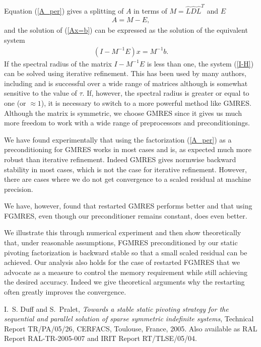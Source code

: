 \documentclass{siamltex}
\begin{document}
Equation (\ref{A_per}) gives a splitting of $A$ in terms of $M = \hat{L} \hat{D} \hat{L}^T$ and $E$
\begin{eqnarray}\label{A_split}
A = M - E,
\end{eqnarray}
and the solution of (\ref{Ax=b}) can be expressed as the solution of the equivalent system
\begin{eqnarray}\label{I-H}
(I - M^{-1} E) x = M^{-1}b.
\end{eqnarray}
If the spectral radius of the matrix $I - M^{-1} E $ is less than one, the system (\ref{I-H}) can be solved using
iterative refinement. This has been used by many authors, including \cite{dupr:05} and is successful over a wide range of matrices although is somewhat
sensitive to the value of $\tau$.  If, however, the
spectral radius is
greater or equal to one (or $\approx 1$), it is necessary to switch to a
more powerful
method like  GMRES. Although the matrix is symmetric, we choose
GMRES since it gives us much more freedom to work with a wide range of
preprocessors and preconditionings.

We have found experimentally that using the factorization (\ref{A_per}) as
a preconditioning for GMRES works in most cases and is, as expected much
more robust than iterative refinement.  Indeed GMRES gives
normwise backward stability in most cases, which is
not the case
for iterative refinement. However, there are cases where we
do not get convergence to a scaled residual at machine precision.

We have, however, found that restarted GMRES performs better and that using
FGMRES,
even though our preconditioner remains constant, does even
better.

We illustrate this through numerical experiment and then show theoretically
that, under reasonable assumptions, FGMRES preconditioned by our static
pivoting
factorization is backward stable so that a small scaled residual can
be achieved.  Our analysis also holds for the case of restarted FGMRES that we advocate as a measure to control the memory requirement while still
achieving the desired accuracy.  Indeed we give theoretical arguments why
the restarting often greatly improves the convergence.


\begin{thebibliography}{10}

{\sc I.~S. Duff and S.~Pralet}, {\em Towards a stable static pivoting strategy
  for the sequential and parallel solution of sparse symmetric indefinite
  systems}, {T}echnical {R}eport TR/PA/05/26, CERFACS, Toulouse, France, 2005.
\newblock Also available as RAL Report RAL-TR-2005-007 and IRIT Report
  RT/TLSE/05/04.

\end{thebibliography}
\end{document}
